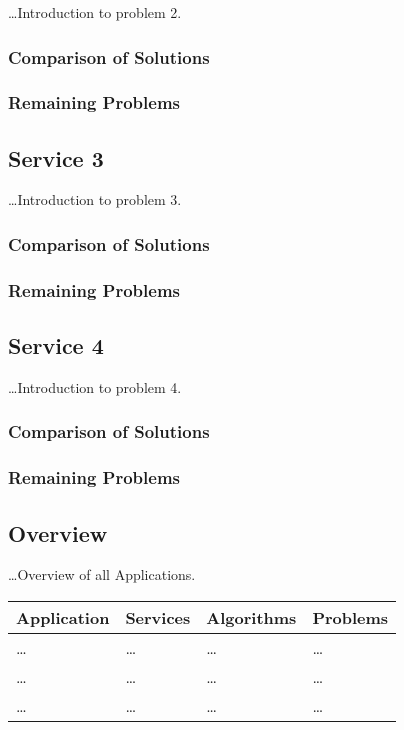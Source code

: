 \documentclass[a4paper]{article}
\begin{document}
      \ldots Introduction to problem 2.

      \subsubsection{Comparison of Solutions}
      \subsubsection{Remaining Problems}

    \subsection{Service 3}
      \ldots Introduction to problem 3.

      \subsubsection{Comparison of Solutions}
      \subsubsection{Remaining Problems}

    \subsection{Service 4}
      \ldots Introduction to problem 4.

      \subsubsection{Comparison of Solutions}
      \subsubsection{Remaining Problems}

    \subsection{Overview}
      \ldots Overview of all Applications.
      
      \begin{tabular}{|p{3cm}|p{3cm}|p{3cm}|p{3cm}|}
        \hline
        Application & Services & Algorithms & Problems \\\hline
        \ldots & \ldots & \ldots & \ldots \\\hline
        \ldots & \ldots & \ldots & \ldots \\\hline
        \ldots & \ldots & \ldots & \ldots \\
        \hline
      \end{tabular}
\end{document}
